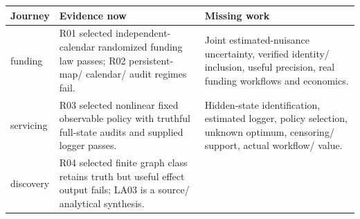 \documentclass[
  10pt,
]{article}
\begin{document}
\begin{longtable}[]{@{}>{\raggedright\arraybackslash}p{}>{\raggedright\arraybackslash}p{}>{\raggedright\arraybackslash}p{}@{}}
\toprule
\begin{minipage}[b]{\linewidth}\raggedright
Journey\strut
\end{minipage} & \begin{minipage}[b]{\linewidth}\raggedright
Evidence now\strut
\end{minipage} & \begin{minipage}[b]{\linewidth}\raggedright
Missing work\strut
\end{minipage}\tabularnewline
\midrule
\endhead
\begin{minipage}[t]{\linewidth}\raggedright
funding\strut
\end{minipage} & \begin{minipage}[t]{\linewidth}\raggedright
R01 selected independent-calendar randomized funding law passes; R02
persistent-map/ calendar/ audit regimes fail.\strut
\end{minipage} & \begin{minipage}[t]{\linewidth}\raggedright
Joint estimated-nuisance uncertainty, verified identity/ inclusion,
useful precision, real funding workflows and economics.\strut
\end{minipage}\tabularnewline
\begin{minipage}[t]{\linewidth}\raggedright
servicing\strut
\end{minipage} & \begin{minipage}[t]{\linewidth}\raggedright
R03 selected nonlinear fixed observable policy with truthful full-state
audits and supplied logger passes.\strut
\end{minipage} & \begin{minipage}[t]{\linewidth}\raggedright
Hidden-state identification, estimated logger, policy selection, unknown
optimum, censoring/ support, actual workflow/ value.\strut
\end{minipage}\tabularnewline
\begin{minipage}[t]{\linewidth}\raggedright
discovery\strut
\end{minipage} & \begin{minipage}[t]{\linewidth}\raggedright
R04 selected finite graph class retains truth but useful effect output
fails; LA03 is a source/ analytical synthesis.\strut
\end{minipage} & \begin{minipage}[t]{\linewidth}\raggedright

\end{minipage}
\end{longtable}
\end{document}
